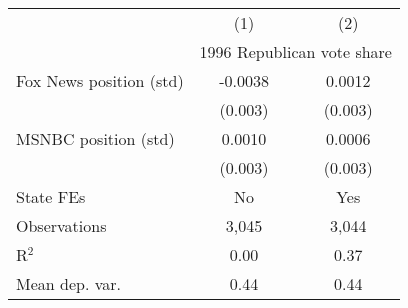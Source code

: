 {
\def\sym#1{\ifmmode^{#1}\else\(^{#1}\)\fi}
\begin{tabular}{l*{2}{c}}
\toprule
                    &\multicolumn{1}{c}{(1)}&\multicolumn{1}{c}{(2)}\\
                    &\multicolumn{2}{c}{1996 Republican vote share}\\
\midrule
Fox News position (std)&     -0.0038         &      0.0012         \\
                    &     (0.003)         &     (0.003)         \\
\addlinespace
MSNBC position (std)&      0.0010         &      0.0006         \\
                    &     (0.003)         &     (0.003)         \\
\addlinespace
State FEs           &          No         &         Yes         \\
\midrule
Observations        &       3,045         &       3,044         \\
R$^2$               &        0.00         &        0.37         \\
Mean dep. var.      &        0.44         &        0.44         \\
\bottomrule
\end{tabular}
}
